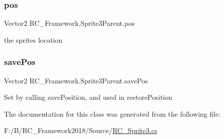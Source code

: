 \subsubsection{\texorpdfstring{pos}{pos}}
{\footnotesize\ttfamily Vector2 R\+C\+\_\+\+Framework.\+Sprite3\+Parent.\+pos\hspace{0.3cm}{\ttfamily [protected]}}



the sprites location 

\mbox{\label{class_r_c___framework_1_1_sprite3_parent_ade2887bc3eda096dd75498936daae484}} 
\subsubsection{\texorpdfstring{save\+Pos}{savePos}}
{\footnotesize\ttfamily Vector2 R\+C\+\_\+\+Framework.\+Sprite3\+Parent.\+save\+Pos}



Set by calling save\+Position, and used in restore\+Position 



The documentation for this class was generated from the following file\+:\begin{DoxyCompactItemize}
\item 
F\+:/\+B/\+R\+C\+\_\+\+Framework2018/\+Source/\mbox{\hyperlink{_r_c___sprite3_8cs}{R\+C\+\_\+\+Sprite3.\+cs}}\end{DoxyCompactItemize}

